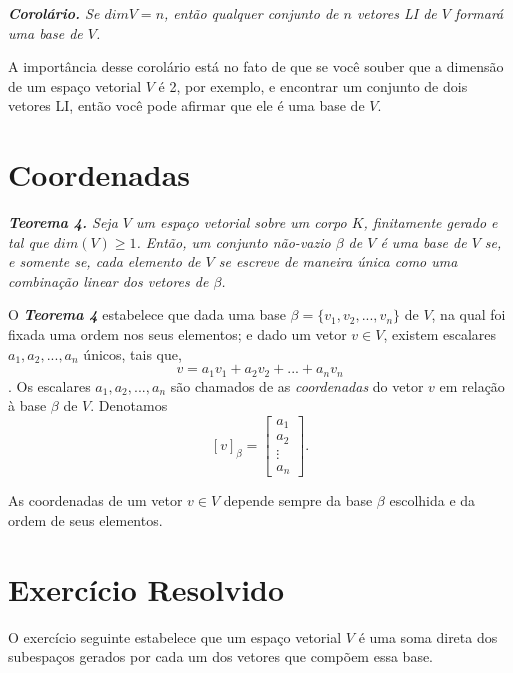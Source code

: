 \vspace{0.3cm}

\textit{\textbf{Corolário.} Se $dimV=n$, então  qualquer conjunto de $n$ vetores LI  de $V$ formará uma base de $V$.}

\vspace{0.3cm}

A importância desse corolário está no fato de que se você souber que a dimensão de um espaço vetorial $V$ é 2, por exemplo, e encontrar um conjunto de dois vetores LI, então você pode afirmar que ele  é uma base de $V$.


\section{Coordenadas}

\textit{\textbf{Teorema 4.} Seja $V$ um espaço vetorial sobre um corpo $K$, finitamente gerado e tal que $dim(V) \geq 1$. Então, um conjunto não-vazio $\beta$  de $V$ é uma base de $V$ se, e somente se, cada elemento de $V$ se  escreve de maneira única como uma combinação linear dos vetores de $\beta$.}

\vspace{0.3cm}

O \textit{\textbf{Teorema 4}} estabelece que dada uma base  $\beta=\{v_1, v_2,...,v_n\}$  de $V$, na qual foi  fixada uma ordem nos seus elementos; e dado um vetor $v \in V$, existem escalares $a_1, a_2,..., a_n$ únicos, tais que, $$v=a_1v_1+a_2v_2+...+a_nv_n$$.
Os escalares $a_1, a_2,..., a_n$  são chamados de as \textit{coordenadas} do vetor $v$ em relação à base $\beta$ de $V$. Denotamos $$[v]_{\beta}=\begin{bmatrix} a_1\\ a_2\\ \vdots \\a_n \end{bmatrix}.$$

As coordenadas de um vetor $v \in V$ depende sempre da base $\beta$ escolhida e da ordem de seus elementos.


\section{Exercício Resolvido}
O exercício seguinte estabelece que um espaço vetorial $V$ é uma soma direta dos subespaços gerados por cada um dos vetores que compõem essa base.

